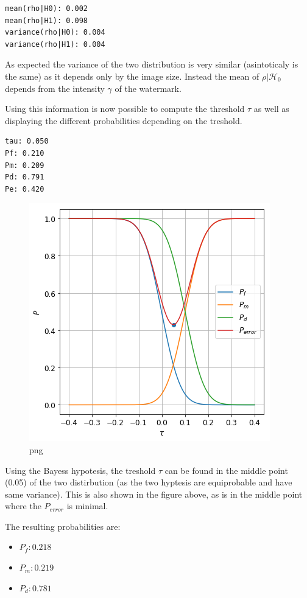 \begin{verbatim}
mean(rho|H0): 0.002
mean(rho|H1): 0.098
variance(rho|H0): 0.004
variance(rho|H1): 0.004
\end{verbatim}

As expected the variance of the two distribution is very similar
(asintoticaly is the same) as it depends only by the image size. Instead
the mean of \(\rho|\mathcal{H}_0\) depends from the intensity \(\gamma\)
of the watermark.

Using this information is now possible to compute the threshold \(\tau\)
as well as displaying the different probabilities depending on the
treshold.

\begin{verbatim}
tau: 0.050
Pf: 0.210
Pm: 0.209
Pd: 0.791
Pe: 0.420
\end{verbatim}

\begin{figure}
\centering
\includegraphics{output_5_1.png}
\caption{png}
\end{figure}

Using the Bayess hypotesis, the treshold \(\tau\) can be found in the
middle point (0.05) of the two distirbution (as the two hyptesis are
equiprobable and have same variance). This is also shown in the figure
above, as is in the middle point where the \(P_{error}\) is minimal.

The resulting probabilities are:

\begin{itemize}
\tightlist
\item
  \(P_f : 0.218\)
\item
  \(P_m : 0.219\)
\item
  \(P_d : 0.781\)
\end{itemize}

